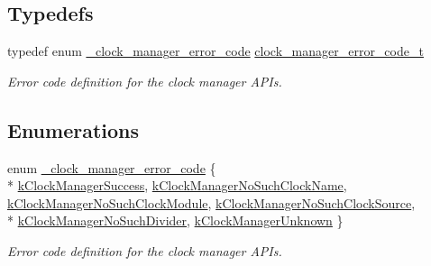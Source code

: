 \subsection*{Typedefs}
\begin{DoxyCompactItemize}
\item 
typedef enum \hyperlink{group__clock__manager_gabd583c936fb62bc8e25cd4273b8447f0}{\+\_\+clock\+\_\+manager\+\_\+error\+\_\+code} \hyperlink{group__clock__manager_ga384b25940eac5c28dceb4e11131818da}{clock\+\_\+manager\+\_\+error\+\_\+code\+\_\+t}\hypertarget{group__clock__manager_ga384b25940eac5c28dceb4e11131818da}{}\label{group__clock__manager_ga384b25940eac5c28dceb4e11131818da}

\begin{DoxyCompactList}\small\item\em Error code definition for the clock manager A\+P\+Is. \end{DoxyCompactList}\end{DoxyCompactItemize}
\subsection*{Enumerations}
\begin{DoxyCompactItemize}
\item 
enum \hyperlink{group__clock__manager_gabd583c936fb62bc8e25cd4273b8447f0}{\+\_\+clock\+\_\+manager\+\_\+error\+\_\+code} \{ \\*
\hyperlink{group__clock__manager_ggabd583c936fb62bc8e25cd4273b8447f0a27edd2a23adbf7e9827bddcca8c4d6b8}{k\+Clock\+Manager\+Success}, 
\hyperlink{group__clock__manager_ggabd583c936fb62bc8e25cd4273b8447f0aea3c6b8205a2f60ab4f683ed14afa09a}{k\+Clock\+Manager\+No\+Such\+Clock\+Name}, 
\hyperlink{group__clock__manager_ggabd583c936fb62bc8e25cd4273b8447f0a981f1392b7c9dc192f015f84832bf316}{k\+Clock\+Manager\+No\+Such\+Clock\+Module}, 
\hyperlink{group__clock__manager_ggabd583c936fb62bc8e25cd4273b8447f0a89ca5f88b4048944221717c8f4b14753}{k\+Clock\+Manager\+No\+Such\+Clock\+Source}, 
\\*
\hyperlink{group__clock__manager_ggabd583c936fb62bc8e25cd4273b8447f0ac6478235feac2c8de2bad5dc4294e137}{k\+Clock\+Manager\+No\+Such\+Divider}, 
\hyperlink{group__clock__manager_ggabd583c936fb62bc8e25cd4273b8447f0a1f2904e4f388c81c36c381557bffd548}{k\+Clock\+Manager\+Unknown}
 \}\begin{DoxyCompactList}\small\item\em Error code definition for the clock manager A\+P\+Is. \end{DoxyCompactList}
\end{DoxyCompactItemize}
